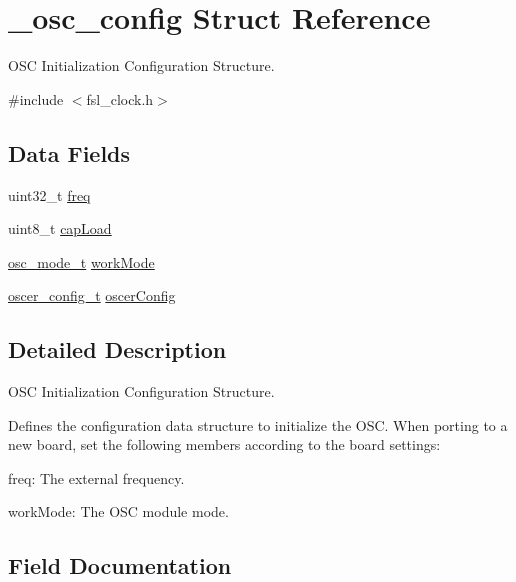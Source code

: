 \hypertarget{struct__osc__config}{}\section{\+\_\+osc\+\_\+config Struct Reference}
\label{struct__osc__config}


O\+SC Initialization Configuration Structure.  




{\ttfamily \#include $<$fsl\+\_\+clock.\+h$>$}

\subsection*{Data Fields}
\begin{DoxyCompactItemize}
\item 
uint32\+\_\+t \mbox{\hyperlink{struct__osc__config_aacfad457f5366fa9265eb0a89e43f23b}{freq}}
\item 
uint8\+\_\+t \mbox{\hyperlink{struct__osc__config_a363d6209668a452191991267e39ab69d}{cap\+Load}}
\item 
\mbox{\hyperlink{group__clock_ga86e25a9d93f6b00c118c7f8eda32d67b}{osc\+\_\+mode\+\_\+t}} \mbox{\hyperlink{struct__osc__config_a5ad1f7dc2a43d53bc15fc8c8d969e605}{work\+Mode}}
\item 
\mbox{\hyperlink{group__clock_ga3280fcfc08b1b4b0989197cc56239fb6}{oscer\+\_\+config\+\_\+t}} \mbox{\hyperlink{struct__osc__config_af37407a042780c0e65e57af58393c629}{oscer\+Config}}
\end{DoxyCompactItemize}


\subsection{Detailed Description}
O\+SC Initialization Configuration Structure. 

Defines the configuration data structure to initialize the O\+SC. When porting to a new board, set the following members according to the board settings\+:
\begin{DoxyEnumerate}
\item freq\+: The external frequency.
\item work\+Mode\+: The O\+SC module mode. 
\end{DoxyEnumerate}

\subsection{Field Documentation}
\mbox{\label{struct__osc__config_a363d6209668a452191991267e39ab69d}} 
